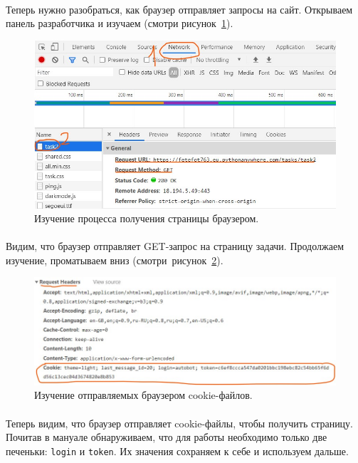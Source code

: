 \documentclass[12pt]{article}
\begin{document}
    \paragraph{}
    Теперь нужно разобраться, как браузер отправляет запросы на сайт.
    Открываем панель разработчика и изучаем (смотри рисунок~\ref{fig:browser1}).
    \begin{figure}[H]
        \centering
        \includegraphics[width=15cm]{BrowserNetworkAnalysis0}
        \caption{Изучение процесса получения страницы браузером.}
        \label{fig:browser1}
    \end{figure}
    \paragraph{}
    Видим, что браузер отправляет GET-запрос на страницу задачи.
    Продолжаем изучение, проматываем вниз (смотри~рисунок~\ref{fig:browser2}).

    \begin{figure}[H]
        \centering
        \includegraphics[width=15cm]{BrowserNetworkAnalysis2}
        \caption{Изучение отправляемых браузером cookie-файлов.}
        \label{fig:browser2}
    \end{figure}
    \paragraph{}
    Теперь видим, что браузер отправляет cookie-файлы, чтобы получить страницу.
    Почитав в мануале обнаруживаем, что для работы необходимо только две печеньки: \verb|login| и \verb|token|.
    Их значения сохраняем к себе и используем дальше.
\end{document}
